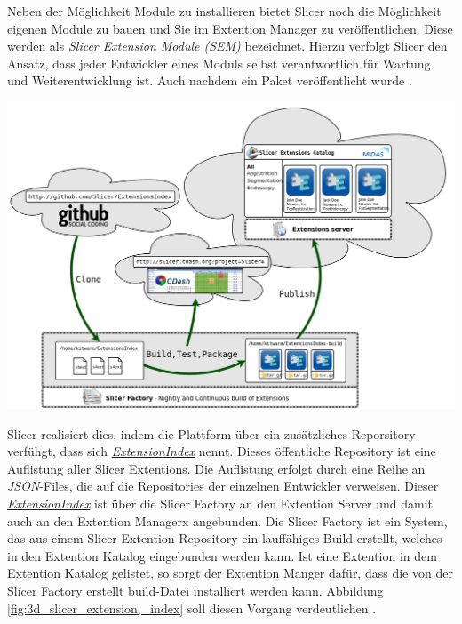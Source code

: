 \begin{minipage}{0.30\textwidth}
	Neben der Möglichkeit Module zu installieren bietet Slicer noch die Möglichkeit
	eigenen Module zu bauen und Sie im Extention Manager zu veröffentlichen. Diese
	werden als \textit{Slicer Extension Module (SEM)} bezeichnet. Hierzu verfolgt
	Slicer den Ansatz, dass jeder Entwickler eines Moduls selbst verantwortlich für
	Wartung und Weiterentwicklung ist. Auch nachdem ein Paket veröffentlicht wurde
	\citep{slicer2024}.
\end{minipage}
\hfill
\begin{minipage}{0.60\textwidth}
	\centering
	\includegraphics[width=1\textwidth]{img/slicer_extention_index.png}
	\label{fig:3d_slicer_extension_index}
\end{minipage}

Slicer realisiert dies, indem die Plattform über ein zusätzliches Reporsitory
verfühgt, dass sich \href{https://github.com/Slicer/ExtensionsIndex?tab=readme-ov-file}{\textit{ExtensionIndex}}
nennt. Dieses öffentliche Repository ist eine Auflistung aller Slicer Extentions.
Die Auflistung erfolgt durch eine Reihe an \textit{JSON}-Files, die auf die Repositories
der einzelnen Entwickler verweisen. Dieser
\href{https://github.com/Slicer/ExtensionsIndex?tab=readme-ov-file}{\textit{ExtensionIndex}}
ist über die Slicer Factory an den Extention Server und damit auch an den
Extention Managerx angebunden. Die Slicer Factory ist ein System, das aus einem
Slicer Extention Repository ein lauffähiges Build erstellt, welches in den Extention
Katalog eingebunden werden kann. Ist eine Extention in dem Extention Katalog
gelistet, so sorgt der Extention Manger dafür, dass die von der Slicer Factory
erstellt build-Datei installiert werden kann. Abbildung \ref{fig:3d_slicer_extension‚_index}
soll diesen Vorgang verdeutlichen \citep[vgl.][]{slicer2024}.

